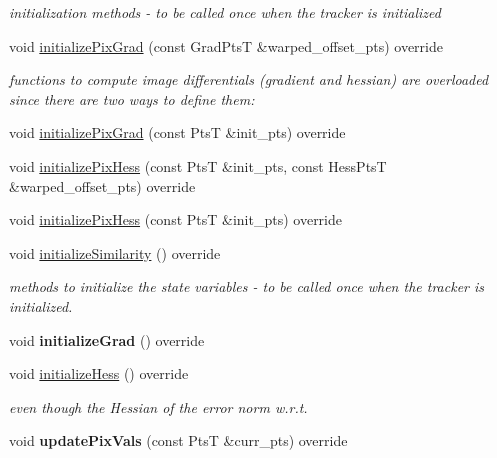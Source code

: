 \begin{DoxyCompactItemize}
\begin{DoxyCompactList}\small\item\em initialization methods -\/ to be called once when the tracker is initialized \end{DoxyCompactList}\item 
void \hyperlink{classSumOfAMs_ad58a98f4c992ef4ea3971ef34108a0de}{initialize\-Pix\-Grad} (const Grad\-Pts\-T \&warped\-\_\-offset\-\_\-pts) override
\begin{DoxyCompactList}\small\item\em functions to compute image differentials (gradient and hessian) are overloaded since there are two ways to define them\-: \end{DoxyCompactList}\item 
void \hyperlink{classSumOfAMs_a5471a78347467e2de3c53a9107b0ffd1}{initialize\-Pix\-Grad} (const Pts\-T \&init\-\_\-pts) override
\item 
void \hyperlink{classSumOfAMs_a0d4f0a8a998165f8b37eed1984dcc700}{initialize\-Pix\-Hess} (const Pts\-T \&init\-\_\-pts, const Hess\-Pts\-T \&warped\-\_\-offset\-\_\-pts) override
\item 
void \hyperlink{classSumOfAMs_aae252eb6ade3ab8efbfd0d12da76e1c3}{initialize\-Pix\-Hess} (const Pts\-T \&init\-\_\-pts) override
\item 
void \hyperlink{classSumOfAMs_a7ed43a8d81436c1e608c30d22063b6f0}{initialize\-Similarity} () override
\begin{DoxyCompactList}\small\item\em methods to initialize the state variables -\/ to be called once when the tracker is initialized. \end{DoxyCompactList}\item 
\hypertarget{classSumOfAMs_a22a36de1cc5dd970a64498c90326c95a}{void {\bfseries initialize\-Grad} () override}\label{classSumOfAMs_a22a36de1cc5dd970a64498c90326c95a}

\item 
void \hyperlink{classSumOfAMs_a54a6b06890890e42cdccd3cb3fa9801a}{initialize\-Hess} () override
\begin{DoxyCompactList}\small\item\em even though the Hessian of the error norm w.\-r.\-t. \end{DoxyCompactList}\item 
\hypertarget{classSumOfAMs_abc0f8bed0db6b79cb009d802f934df1f}{void {\bfseries update\-Pix\-Vals} (const Pts\-T \&curr\-\_\-pts) override}\label{classSumOfAMs_abc0f8bed0db6b79cb009d802f934df1f}


\end{DoxyCompactItemize}
